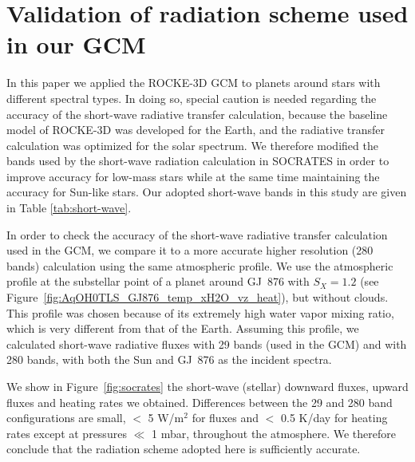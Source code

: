 \documentclass[11pt,numberedappendix,twocolappendix,]{emulateapj}
\def\wv{water vapor}
\begin{document}
\section{Validation of radiation scheme used in our GCM}
\label{ap:radiation}

In this paper we applied the ROCKE-3D GCM to planets around stars with different spectral types. 
In doing so, special caution is needed regarding the accuracy of the short-wave radiative transfer calculation, because the baseline model of ROCKE-3D was  developed for the Earth, and the radiative transfer calculation was optimized for the solar spectrum. 
We therefore modified the bands used by the short-wave radiation calculation in SOCRATES in order to improve accuracy for low-mass stars while at the same time maintaining the accuracy for Sun-like stars.
Our adopted short-wave bands in this study are given in Table \ref{tab:short-wave}.

In order to check the accuracy of the short-wave radiative transfer calculation used in the GCM, we compare it to a more accurate higher resolution (280 bands) calculation using the same atmospheric profile. 
We use the atmospheric profile at the substellar point of a planet around GJ~876 with $S_X=1.2$ (see Figure~\ref{fig:AqOH0TLS_GJ876_temp_xH2O_vz_heat}), but without clouds. 
This profile was chosen because of its extremely high \wv{} mixing ratio, which is very different from that of the Earth. 
Assuming this profile, we calculated short-wave radiative fluxes with 29 bands (used in the GCM) and with 280 bands, with both the Sun and GJ~876 as the incident spectra.

We show in Figure~\ref{fig:socrates} the short-wave (stellar) downward fluxes, upward fluxes and heating rates we obtained.
Differences between the 29 and 280 band configurations are small, $<$ 5 W/m$^2$ for fluxes and $<$ 0.5 K/day for heating rates except at pressures $\ll$ 1 mbar, throughout the atmosphere. We therefore conclude that the radiation scheme adopted here is sufficiently accurate.
\end{document}
